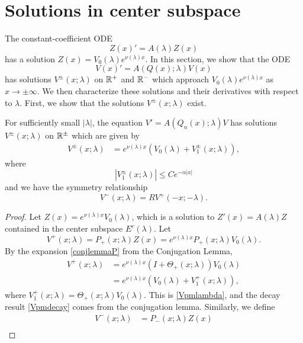 \documentclass[thesis.tex]{subfiles}
\begin{document}
\section{Solutions in center subspace}

The constant-coefficient ODE
\[
Z(x)' = A(\lambda)Z(x)
\]
has a solution $Z(x) = V_0(\lambda)e^{\nu(\lambda)x}$. In this section, we show that the ODE
\[
V(x)' = A(Q(x); \lambda)V(x)
\]
has solutions $V^\pm(x; \lambda)$ on $\mathbb{R}^+$ and $\mathbb{R}^-$ which approach $V_0(\lambda)e^{\nu(\lambda)x}$ as $x \rightarrow \pm \infty$. We then characterize these solutions and their derivatives with respect to $\lambda$. First, we show that the solutions $V^\pm(x; \lambda)$ exist.

\begin{lemma}\label{lemma:Vpm}
For sufficiently small $|\lambda|$, the equation $V' = A(Q_n(x); \lambda)V$ has solutions $V^\pm(x; \lambda)$ on $\mathbb{R}^\pm$ which are given by
\begin{align}\label{Vpmlambda}
V^\pm(x; \lambda) &= e^{\nu(\lambda)x}(V_0(\lambda) + V_1^\pm(x; \lambda)),
\end{align}
where
\begin{equation}\label{Vpmdecay}
|V_1^\pm(x; \lambda)| \leq C e^{-\alpha |x|}
\end{equation}
and we have the symmetry relationship
\begin{equation}\label{Vpmsymmetry}
V^-(x; \lambda) = R V^+(-x; -\lambda).
\end{equation}
\begin{proof}
Let $Z(x) = e^{\nu(\lambda)x}V_0(\lambda)$, which is a solution to $Z'(x) = A(\lambda)Z$ contained in the center subspace $E^c(\lambda)$. Let
\begin{equation}\label{defVplus}
V^+(x; \lambda) = P_+(x; \lambda) Z(x) = e^{\nu(\lambda)x}P_+(x; \lambda)V_0(\lambda).
\end{equation}
By the expansion \eqref{conjlemmaP} from the Conjugation Lemma,
\begin{align*}
V^+(x; \lambda) &= e^{\nu(\lambda)x}(I + \Theta_+(x; \lambda))V_0(\lambda) \\
&= e^{\nu(\lambda)x}( V_0(\lambda) + V_1^+(x; \lambda)),
\end{align*}
where $V_1^+(x; \lambda) = \Theta_+(x; \lambda) V_0(\lambda)$. This is \eqref{Vpmlambda}, and the decay result \eqref{Vpmdecay} comes from the conjugation lemma. Similarly, we define 
\begin{align*}
V^-(x; \lambda) &= P_-(x; \lambda) Z(x) \\

\end{align*}
\end{proof}
\end{lemma}
\end{document}
